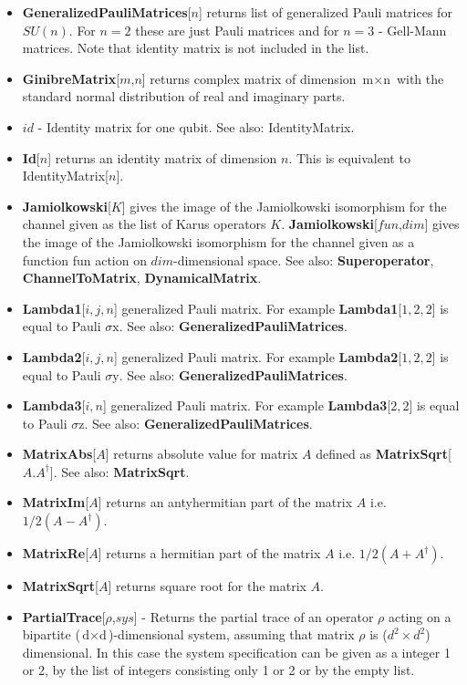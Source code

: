 \documentclass[a4paper,10pt]{scrartcl}
\begin{document}
\begin{itemize}
\item  \textbf{GeneralizedPauliMatrices}[$n$] returns list of generalized Pauli matrices for $SU(n)$. For $n=2$ these are just Pauli matrices and for $n=3$ - Gell-Mann matrices. Note that identity matrix is not included in the list.
\item  \textbf{GinibreMatrix}[$m$,$n$] returns complex matrix of dimension $\text{m$\times $n}$ with the standard normal distribution of real and imaginary parts.
\item  $id$ - Identity matrix for one qubit. See also: IdentityMatrix.
\item  \textbf{Id}[$n$] returns an identity matrix of dimension $n$. This is equivalent to IdentityMatrix[$n$].
\item  \textbf{Jamiolkowski}[$K$] gives the image of the Jamiolkowski isomorphism for the channel given as the list of Karus operators $K$. \newline{}
\textbf{Jamiolkowski}[$fun$,$dim$] gives the image of the Jamiolkowski isomorphism for the channel given as a function fun action on $dim$-dimensional space. See also: \textbf{Superoperator}, \textbf{ChannelToMatrix}, \textbf{DynamicalMatrix}.
\item  \textbf{Lambda1}[$i,j,n$] generalized Pauli matrix. For example \textbf{Lambda1}[$1,2,2$] is equal to Pauli $\text{$\sigma $x}$. See also: \textbf{GeneralizedPauliMatrices}.
\item  \textbf{Lambda2}[$i,j,n$] generalized Pauli matrix. For example \textbf{Lambda2}[$1,2,2$] is equal to Pauli $\text{$\sigma $y}$. See also: \textbf{GeneralizedPauliMatrices}.
\item  \textbf{Lambda3}[$i,n$] generalized Pauli matrix. For example \textbf{Lambda3}[$2,2$] is equal to Pauli $\text{$\sigma $z}$. See also: \textbf{GeneralizedPauliMatrices}.
\item  \textbf{MatrixAbs}[$A$] returns absolute value for matrix $A$ defined as \textbf{MatrixSqrt}[$A.A^{\dagger }$]. See also: \textbf{MatrixSqrt}.
\item  \textbf{MatrixIm}[$A$] returns an antyhermitian part of the matrix $A$ i.e. $1/2(A-A^{\dagger })$.
\item  \textbf{MatrixRe}[$A$] returns a hermitian part of the matrix $A$ i.e. $1/2(A+A^{\dagger })$.
\item  \textbf{MatrixSqrt}[$A$] returns square root for the matrix $A$.
\item  \textbf{PartialTrace}[$\rho$,$sys$] - Returns the partial trace of an operator $\rho$ acting on a bipartite ($\text{d$\times $d}$)-dimensional system, assuming that matrix $\rho$ is ($d^2\times d^2$) dimensional. In this case the system specification can be given as a integer 1 or 2, by the list of integers consisting only 1 or 2 or by the empty list. \newline{}

\end{itemize}
\end{document}
